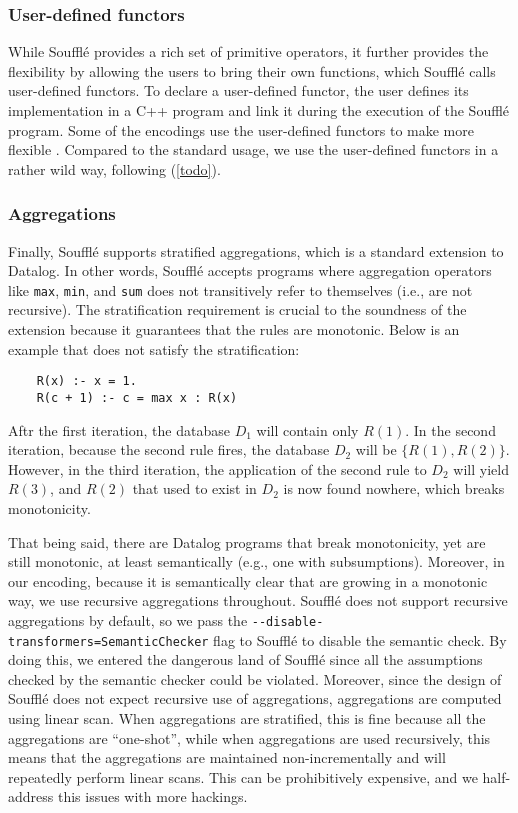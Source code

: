\subsubsection*{User-defined functors}
While Souffl\'e provides a rich set of primitive operators,
 it further provides the flexibility by allowing the users
 to bring their own functions, which Souffl\'e calls
 user-defined functors.
To declare a user-defined functor, 
 the user defines its implementation in a C++ program and
 link it during the execution of the Souffl\'e program.
Some of the encodings use the user-defined functors 
 to make \eqrel{} more flexible \citep{zucker-udf-1,zucker-udf-2}.
Compared to the standard usage, 
 we use the user-defined functors in a rather wild way, 
 following \citep{zucker-udf-1} (\autoref{todo}).

\subsubsection*{Aggregations}
Finally, Souffl\'e supports stratified aggregations, 
 which is a standard extension to Datalog.
In other words, 
 Souffl\'e accepts programs where 
 aggregation operators like \texttt{max}, \texttt{min}, and \texttt{sum}
 does not transitively refer to themselves (i.e., are not recursive).
The stratification requirement is crucial to the soundness of the extension
 because it guarantees that the rules are monotonic.
Below is an example that does not satisfy the stratification:
\begin{verbatim}
    R(x) :- x = 1.
    R(c + 1) :- c = max x : R(x)
\end{verbatim}
Aftr the first iteration, the database $D_1$ will contain only $R(1)$. 
In the second iteration, because the second rule fires,
 the database $D_2$ will be $\{R(1), R(2)\}$.
However, in the third iteration,
 the application of the second rule to $D_2$ will yield
 $R(3)$, and $R(2)$ that used to exist in $D_2$ is now found nowhere,
 which breaks monotonicity.

That being said, there are Datalog programs that break monotonicity,
 yet are still monotonic, at least semantically (e.g., one with subsumptions).
Moreover, in our encoding, because it is semantically clear that 
 \egraphs are growing in a monotonic way, we use recursive aggregations 
 throughout.
Souffl\'e does not support recursive aggregations by default,
 so we pass the \verb|--disable-transformers=SemanticChecker|
 flag to Souffl\'e to disable the semantic check.
By doing this, 
 we entered the dangerous land of Souffl\'e 
 since all the assumptions checked by the semantic checker
 could be violated.
Moreover,
 since the design of Souffl\'e does not expect
 recursive use of aggregations,
 aggregations are computed using linear scan.
When aggregations are stratified,
 this is fine because all the aggregations are ``one-shot'',
 while when aggregations are used recursively, 
 this means that the aggregations
 are maintained non-incrementally 
 and will repeatedly perform linear scans.
This can be prohibitively expensive, 
 and we half-address this issues with more hackings.

